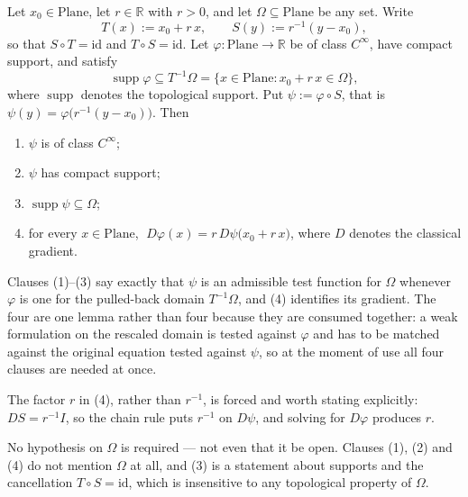 \begin{lemma}
Let $x_0\in\mathrm{Plane}$, let $r\in\mathbb{R}$ with $r>0$, and let
$\Omega\subseteq\mathrm{Plane}$ be any set.  Write
\[
  T(x):=x_0+r\,x,\qquad S(y):=r^{-1}(y-x_0),
\]
so that $S\circ T=\mathrm{id}$ and $T\circ S=\mathrm{id}$.  Let
$\varphi\colon\mathrm{Plane}\to\mathbb{R}$ be of class $C^{\infty}$, have compact support, and
satisfy
\[
  \operatorname{supp}\varphi\subseteq T^{-1}\Omega=\{x\in\mathrm{Plane}:x_0+r\,x\in\Omega\},
\]
where $\operatorname{supp}$ denotes the topological support.  Put $\psi:=\varphi\circ S$, that is
$\psi(y)=\varphi\bigl(r^{-1}(y-x_0)\bigr)$.  Then
\begin{enumerate}
\item[(1)] $\psi$ is of class $C^{\infty}$;
\item[(2)] $\psi$ has compact support;
\item[(3)] $\operatorname{supp}\psi\subseteq\Omega$;
\item[(4)] for every $x\in\mathrm{Plane}$,
  $\;D\varphi(x)=r\,D\psi\bigl(x_0+r\,x\bigr)$, where $D$ denotes the classical gradient.
\end{enumerate}

Clauses (1)--(3) say exactly that $\psi$ is an admissible test function for $\Omega$ whenever
$\varphi$ is one for the pulled-back domain $T^{-1}\Omega$, and (4) identifies its gradient.  The
four are one lemma rather than four because they are consumed together: a weak formulation on
the rescaled domain is tested against $\varphi$ and has to be matched against the original
equation tested against $\psi$, so at the moment of use all four clauses are needed at once.

The factor $r$ in (4), rather than $r^{-1}$, is forced and worth stating explicitly: $DS=r^{-1}I$,
so the chain rule puts $r^{-1}$ on $D\psi$, and solving for $D\varphi$ produces $r$.

No hypothesis on $\Omega$ is required --- not even that it be open.  Clauses (1), (2) and (4) do
not mention $\Omega$ at all, and (3) is a statement about supports and the cancellation
$T\circ S=\mathrm{id}$, which is insensitive to any topological property of $\Omega$.
\end{lemma}
